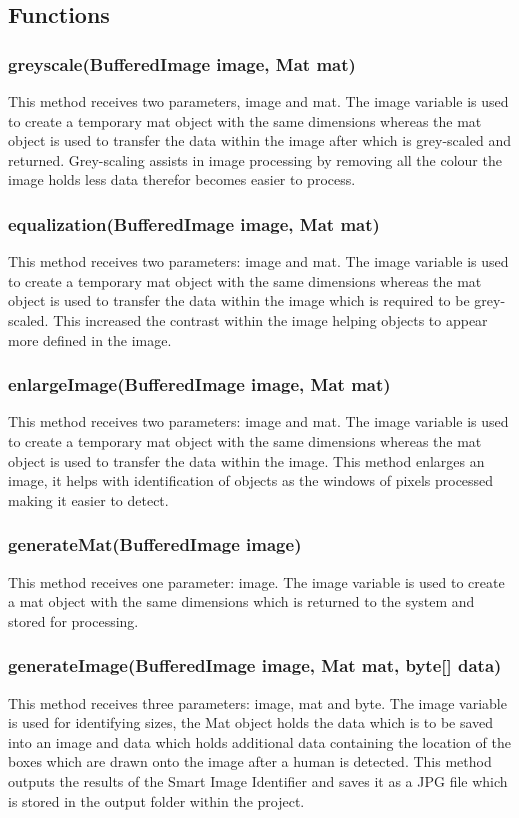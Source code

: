 \documentclass[a4paper,12pt]{report}
\begin{document}
\subsection{Functions}
\subsubsection{greyscale(BufferedImage image, Mat mat)}
This method receives two parameters, image and mat. The image variable is used to
create a temporary mat object with the same dimensions whereas the mat object is used
to transfer the data within the image after which is grey-scaled and returned.
Grey-scaling assists in image processing by removing all the colour the image holds less
data therefor becomes easier to process.
\subsubsection{equalization(BufferedImage image, Mat mat)}
This method receives two parameters: image and mat. The image variable is used to
create a temporary mat object with the same dimensions whereas the mat object is used
to transfer the data within the image which is required to be grey-scaled.
This increased the contrast within the image helping objects to appear more defined in
the image.
\subsubsection{enlargeImage(BufferedImage image, Mat mat)}
This method receives two parameters: image and mat. The image variable is used to
create a temporary mat object with the same dimensions whereas the mat object is used
to transfer the data within the image.
This method enlarges an image, it helps with identification of objects as the windows of
pixels processed making it easier to detect.
\newpage
\subsubsection{generateMat(BufferedImage image)}
This method receives one parameter: image. The image variable is used to create a mat
object with the same dimensions which is returned to the system and stored for
processing.
\subsubsection{generateImage(BufferedImage image, Mat mat, byte[] data)}
This method receives three parameters: image, mat and byte. The image variable is used
for identifying sizes, the Mat object holds the data which is to be saved into an image and
data which holds additional data containing the location of the boxes which are drawn
onto the image after a human is detected.
This method outputs the results of the Smart Image Identifier and saves it as a JPG file
which is stored in the output folder within the project.
\end{document}
